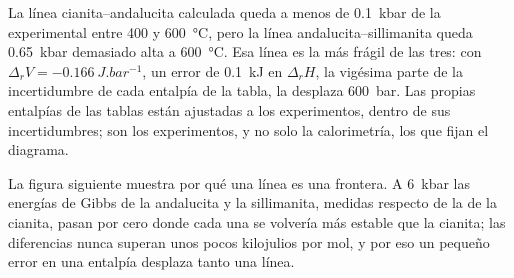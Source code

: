 La línea cianita--andalucita calculada queda a menos de \qty{0.1}{kbar} de la experimental
entre 400 y \qty{600}{\celsius}, pero la línea andalucita--sillimanita queda
\qty{0.65}{kbar} demasiado alta a \qty{600}{\celsius}. Esa línea es la más frágil de las
tres: con $\Delta_r V = \qty{-0.166}{J.bar^{-1}}$, un error de \qty{0.1}{kJ} en
$\Delta_r H$, la vigésima parte de la incertidumbre de cada entalpía de la tabla, la desplaza
\qty{600}{bar}. Las propias entalpías de las tablas están ajustadas a los
experimentos, dentro de sus incertidumbres; son los experimentos, y no solo la calorimetría, los que fijan el
diagrama.

La figura siguiente muestra por qué una línea es una frontera. A \qty{6}{kbar} las energías de Gibbs de
la andalucita y la sillimanita, medidas respecto de la de la cianita, pasan por cero donde cada una
se volvería más estable que la cianita; las diferencias nunca superan unos pocos kilojulios por mol,
y por eso un pequeño error en una entalpía desplaza tanto una línea.

\begin{omfigure}
\centering
{}
\par{}
\end{omfigure}

